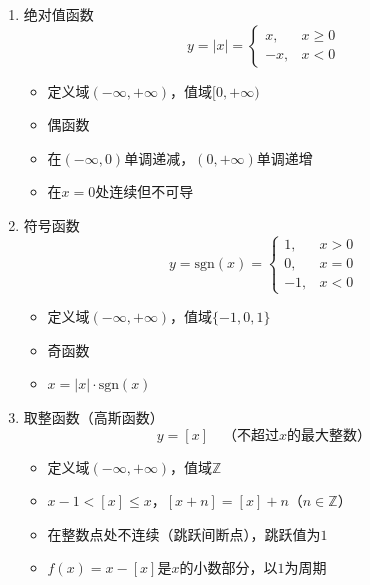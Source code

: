 \documentclass[../book.tex]{subfiles}
\begin{document}
    \begin{enumerate}
        \item 绝对值函数
        \[
            y = |x| = \begin{cases} x, & x \geq 0 \\ -x, & x < 0 \end{cases}
        \]
        \begin{itemize}
            \item 定义域$(-\infty, +\infty)$，值域$[0, +\infty)$
            \item 偶函数
            \item 在$(-\infty, 0)$单调递减，$(0, +\infty)$单调递增
            \item 在$x = 0$处连续但不可导
        \end{itemize}

        \item 符号函数
        \[
            y = \mathrm{sgn}(x) = \begin{cases} 1, & x > 0 \\ 0, & x = 0 \\ -1, & x < 0 \end{cases}
        \]
        \begin{itemize}
            \item 定义域$(-\infty, +\infty)$，值域$\{-1, 0, 1\}$
            \item 奇函数
            \item $x = |x| \cdot \mathrm{sgn}(x)$
        \end{itemize}

        \item 取整函数（高斯函数）
        \[
            y = [x] \quad \text{（不超过$x$的最大整数）}
        \]
        \begin{itemize}
            \item 定义域$(-\infty, +\infty)$，值域$\mathbb{Z}$
            \item $x - 1 < [x] \leq x$，$[x + n] = [x] + n$（$n \in \mathbb{Z}$）
            \item 在整数点处不连续（跳跃间断点），跳跃值为$1$
            \item $f(x) = x - [x]$是$x$的小数部分，以$1$为周期
        \end{itemize}
    \end{enumerate}
\end{document}
